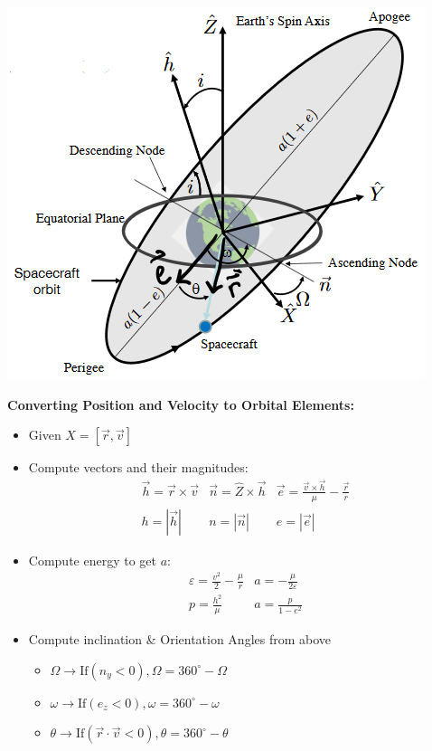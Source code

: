 \documentclass{article}
\begin{document}
\begin{multicols*}{3}
    \includegraphics[width=\linewidth]{Figures/Orbital_Elements.png}

    \textbf{Converting Position and Velocity to Orbital Elements:}\par
    \begin{itemize}
        \item Given $X = [\vec{r},\vec{v}]$
        \item Compute vectors and their magnitudes:
        \begin{equation*}
            \begin{array}{lll}
                \vec{h}=\vec{r} \times \vec{v} & \vec{n} = \hat{Z} \times \vec{h} & \vec{e}=\frac{\vec{v} \times \vec{h}}{\mu}-\frac{\vec{r}}{r}\\
                h=|\vec{h}| & n=|\vec{n}| & e=|\vec{e}|
            \end{array}
        \end{equation*}
        \item Compute energy to get $a$:
        \begin{equation*}
            \begin{array}{ll}
                \varepsilon=\frac{v^2}{2}-\frac{\mu}{r} & a=-\frac{\mu}{2\varepsilon}\\
                p=\frac{h^2}{\mu} & a = \frac{p}{1-e^2}
            \end{array}
        \end{equation*}
        \item Compute inclination \& Orientation Angles from above
            \begin{itemize}
                \item $\Omega\rightarrow \text{If} (n_y<0), \Omega=360^\circ-\Omega$
                \item $\omega\rightarrow \text{If} (e_z<0), \omega=360^\circ-\omega$
                \item $\theta\rightarrow \text{If} (\vec{r}\cdot\vec{v}<0), \theta=360^\circ-\theta$
            \end{itemize}
    \end{itemize}


\end{multicols*}
\end{document}

